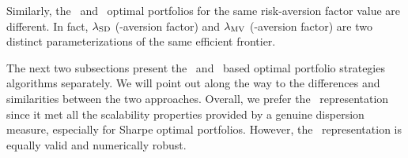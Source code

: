 Similarly, the \SD\ and \MV\ optimal portfolios for the same risk-aversion factor value are different.
In fact, $\lambda_{\rm SD}$ (\SD-aversion factor) and $\lambda_{\rm MV}$ (\MV-aversion factor)
are two distinct parameterizations of the same efficient frontier.

The next two subsections present the \SD\ and \MV\ based optimal portfolio strategies algorithms separately.
We will point out along the way to the differences and similarities between the two approaches.
Overall, we prefer the \SD\ representation since it met all the scalability properties provided by a genuine
dispersion measure, especially for Sharpe optimal portfolios. However, the \MV\ representation is equally valid and
numerically robust.

\BackToContents



